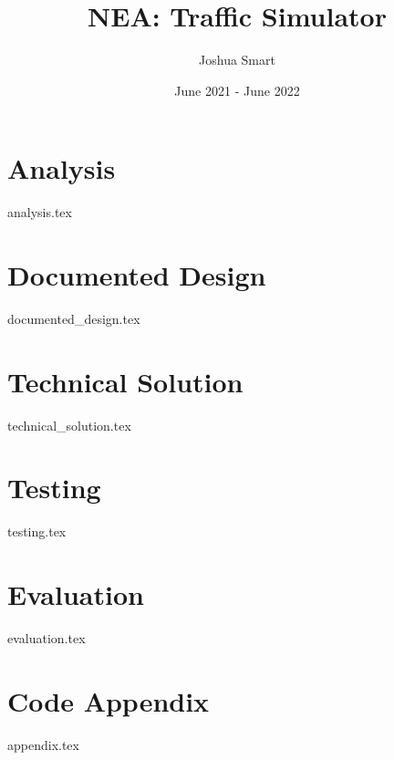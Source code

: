 \documentclass{report}
\title{NEA: Traffic Simulator}
\author{Joshua Smart}
\date{June 2021 - June 2022}
\begin{document}
    \begin{titlepage}
        \maketitle
    \end{titlepage}

    \tableofcontents

    \setparagraphstyling
    \chapter{Analysis}
        \label{analysis}
        {analysis.tex}

    \chapter{Documented Design}
        \label{design}
        {documented_design.tex}

    \chapter{Technical Solution}
        {technical_solution.tex}

    \chapter{Testing}
        {testing.tex}

    \chapter{Evaluation}
        {evaluation.tex}

    \printbibliography

    \appendix

    \chapter{Code Appendix}
        {appendix.tex}
\end{document}
